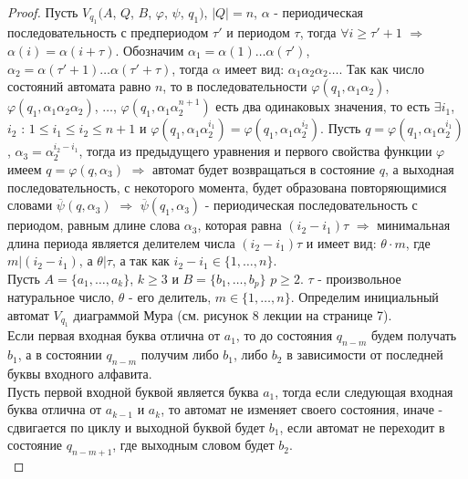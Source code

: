 \documentclass[a4paper, 12pt]{article}
\renewcommand{\phi}{\varphi}
\theoremstyle{definition}
\theoremstyle{plain}
\theoremstyle{remark}
\begin{document}
  \begin{proof}
    Пусть $V_{q_1}(A$, $Q$, $B$, $\phi$, $\psi$, $q_1)$, $|Q|=n$, $\alpha$ - периодическая последовательность с предпериодом $\tau'$ и периодом $\tau$, тогда $\forall i\geqslant\tau'+1$ $\Longrightarrow$ $\alpha(i)=\alpha(i+\tau)$. Обозначим $\alpha_1=\alpha(1)\ldots\alpha(\tau')$, $\alpha_2=\alpha(\tau'+1)\ldots\alpha(\tau'+\tau)$, тогда $\alpha$ имеет вид: $\alpha_1\alpha_2\alpha_2\ldots$. Так как число состояний автомата равно $n$, то в последовательности $\phi(q_1, \alpha_1\alpha_2)$, $\phi(q_1, \alpha_1\alpha_2\alpha_2)$, $\ldots$, $\phi(q_1,\alpha_1\alpha_2^{n+1})$ есть два одинаковых значения, то есть $\exists i_1$, $i_2$ : $1\leqslant i_1\leq i_2\leqslant n+1$ и $\phi(q_1,\alpha_1\alpha_2^{i_1})=\phi(q_1,\alpha_1\alpha_2^{i_2})$. Пусть $q=\phi(q_1,\alpha_1\alpha_2^{i_1})$, $\alpha_3=\alpha_2^{i_2-i_1}$, тогда из предыдущего уравнения и первого свойства функции $\phi$ имеем $q=\phi(q,\alpha_3)$ $\Longrightarrow$ автомат будет возвращаться в состояние $q$, а выходная последовательность, с некоторого момента, будет образована повторяющимися словами $\overline{\psi}(q,\alpha_3)$ $\Longrightarrow$ $\overline{\psi}(q_1,\alpha_3)$ - периодическая последовательность с периодом, равным длине слова $\alpha_3$, которая равна $(i_2-i_1)\tau$ $\Longrightarrow$ минимальная длина периода является делителем числа $(i_2-i_1)\tau$ и имеет вид: $\theta\cdot m$, где $m|(i_2-i_1)$, а $\theta|\tau$, а так как $i_2-i_1\in\{1,\ldots,n\}$.\\
    Пусть $A=\{a_1,\ldots,a_k\}$, $k\geqslant3$ и $B=\{b_1,\ldots,b_p\}$ $p\geqslant2$. $\tau$ - произвольное натуральное число, $\theta$ - его делитель, $m\in \{1,\ldots,n\}$. Определим инициальный автомат $V_{q_1}$ диаграммой Мура (см. рисунок 8 лекции на странице 7).\\
    Если первая входная буква отлична от $a_1$, то до состояния $q_{n-m}$ будем получать $b_1$, а в состоянии $q_{n-m}$ получим либо $b_1$, либо $b_2$ в зависимости от последней буквы входного алфавита.\\
    Пусть первой входной буквой является буква $a_1$, тогда если следующая входная буква отлична от $a_{k-1}$ и $a_k$, то автомат не изменяет своего состояния, иначе - сдвигается по циклу и выходной буквой будет $b_1$, если автомат не переходит в состояние $q_{n-m+1}$, где выходным словом будет $b_2$.\\

\end{proof}
\end{document}
